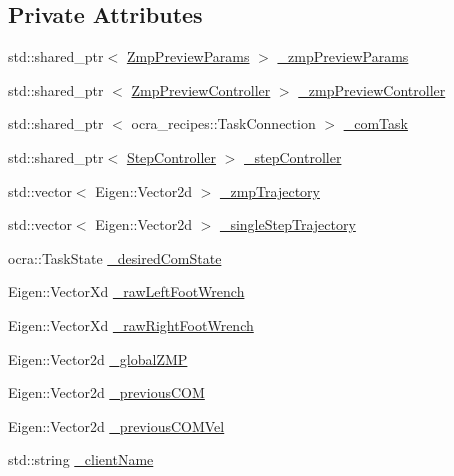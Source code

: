 \subsection*{\-Private \-Attributes}
\begin{DoxyCompactItemize}
\item 
std\-::shared\-\_\-ptr$<$ \hyperlink{structZmpPreviewParams}{\-Zmp\-Preview\-Params} $>$ \hyperlink{classWalkingClient_a9a2cf2d6107ab91fc5bd1d82a3b85a84}{\-\_\-zmp\-Preview\-Params}
\item 
std\-::shared\-\_\-ptr\*
$<$ \hyperlink{classZmpPreviewController}{\-Zmp\-Preview\-Controller} $>$ \hyperlink{classWalkingClient_ae570aa07bed9e336eda93f331f3485fb}{\-\_\-zmp\-Preview\-Controller}
\item 
std\-::shared\-\_\-ptr\*
$<$ ocra\-\_\-recipes\-::\-Task\-Connection $>$ \hyperlink{classWalkingClient_aa798d6193535e80816f8107ee5fb2172}{\-\_\-com\-Task}
\item 
std\-::shared\-\_\-ptr$<$ \hyperlink{classStepController}{\-Step\-Controller} $>$ \hyperlink{classWalkingClient_aff3d76fc360548d6c0c0ea540a0b7509}{\-\_\-step\-Controller}
\item 
std\-::vector$<$ \-Eigen\-::\-Vector2d $>$ \hyperlink{classWalkingClient_a8b8a3d7fe6e12d49a0e72d05f9938564}{\-\_\-zmp\-Trajectory}
\item 
std\-::vector$<$ \-Eigen\-::\-Vector2d $>$ \hyperlink{classWalkingClient_a5d74b737b225cec818922a2b774eed9e}{\-\_\-single\-Step\-Trajectory}
\item 
ocra\-::\-Task\-State \hyperlink{classWalkingClient_a2625bf687aa3141f5a2404c8d9b3c392}{\-\_\-desired\-Com\-State}
\item 
\-Eigen\-::\-Vector\-Xd \hyperlink{classWalkingClient_a1c3fb4d182e33d6d9386e9bb05aa4ae8}{\-\_\-raw\-Left\-Foot\-Wrench}
\item 
\-Eigen\-::\-Vector\-Xd \hyperlink{classWalkingClient_a9df32e0c73632c5f869e5933e20def71}{\-\_\-raw\-Right\-Foot\-Wrench}
\item 
\-Eigen\-::\-Vector2d \hyperlink{classWalkingClient_aa784eac1247f0d858e2364e0c2bc25b2}{\-\_\-global\-Z\-M\-P}
\item 
\-Eigen\-::\-Vector2d \hyperlink{classWalkingClient_a549751e511e023d5fc73eccd1c185317}{\-\_\-previous\-C\-O\-M}
\item 
\-Eigen\-::\-Vector2d \hyperlink{classWalkingClient_aa0c7669193a8a42ed289c79523580033}{\-\_\-previous\-C\-O\-M\-Vel}
\item 
std\-::string \hyperlink{classWalkingClient_aff02b341d5e1f500dc9a849337319a8d}{\-\_\-client\-Name}

\end{DoxyCompactItemize}
